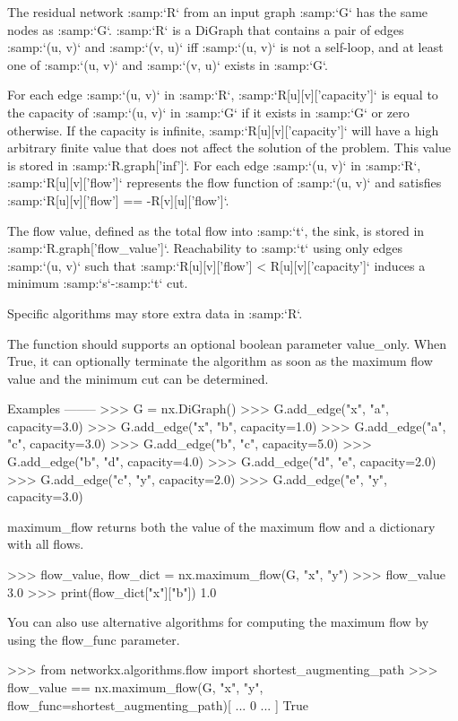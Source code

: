 \begin{DoxyVerb}
The residual network :samp:`R` from an input graph :samp:`G` has the
same nodes as :samp:`G`. :samp:`R` is a DiGraph that contains a pair
of edges :samp:`(u, v)` and :samp:`(v, u)` iff :samp:`(u, v)` is not a
self-loop, and at least one of :samp:`(u, v)` and :samp:`(v, u)` exists
in :samp:`G`.

For each edge :samp:`(u, v)` in :samp:`R`, :samp:`R[u][v]['capacity']`
is equal to the capacity of :samp:`(u, v)` in :samp:`G` if it exists
in :samp:`G` or zero otherwise. If the capacity is infinite,
:samp:`R[u][v]['capacity']` will have a high arbitrary finite value
that does not affect the solution of the problem. This value is stored in
:samp:`R.graph['inf']`. For each edge :samp:`(u, v)` in :samp:`R`,
:samp:`R[u][v]['flow']` represents the flow function of :samp:`(u, v)` and
satisfies :samp:`R[u][v]['flow'] == -R[v][u]['flow']`.

The flow value, defined as the total flow into :samp:`t`, the sink, is
stored in :samp:`R.graph['flow_value']`. Reachability to :samp:`t` using
only edges :samp:`(u, v)` such that
:samp:`R[u][v]['flow'] < R[u][v]['capacity']` induces a minimum
:samp:`s`-:samp:`t` cut.

Specific algorithms may store extra data in :samp:`R`.

The function should supports an optional boolean parameter value_only. When
True, it can optionally terminate the algorithm as soon as the maximum flow
value and the minimum cut can be determined.

Examples
--------
>>> G = nx.DiGraph()
>>> G.add_edge("x", "a", capacity=3.0)
>>> G.add_edge("x", "b", capacity=1.0)
>>> G.add_edge("a", "c", capacity=3.0)
>>> G.add_edge("b", "c", capacity=5.0)
>>> G.add_edge("b", "d", capacity=4.0)
>>> G.add_edge("d", "e", capacity=2.0)
>>> G.add_edge("c", "y", capacity=2.0)
>>> G.add_edge("e", "y", capacity=3.0)

maximum_flow returns both the value of the maximum flow and a
dictionary with all flows.

>>> flow_value, flow_dict = nx.maximum_flow(G, "x", "y")
>>> flow_value
3.0
>>> print(flow_dict["x"]["b"])
1.0

You can also use alternative algorithms for computing the
maximum flow by using the flow_func parameter.

>>> from networkx.algorithms.flow import shortest_augmenting_path
>>> flow_value == nx.maximum_flow(G, "x", "y", flow_func=shortest_augmenting_path)[
...     0
... ]
True\end{DoxyVerb}
 \mbox{\label{namespacenetworkx_1_1algorithms_1_1flow_1_1maxflow_a1a1661c7cb34faa8bbe10d57cfc3ab3c}} 
